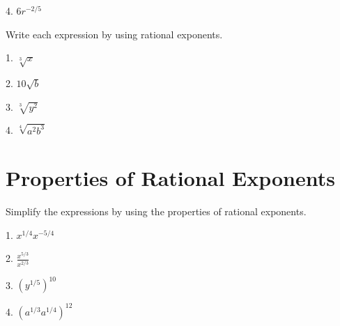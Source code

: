 \documentclass[12pt]{article}
\begin{document}
\vspace{4.5em} 

4. $6r^{-2/5}$ 

\vspace{4.5em} 

Write each expression by using rational exponents. 

1. $\sqrt[3]{x}$ 

\vspace{4.5em} 

2. $10\sqrt{b}$ 

\vspace{4.5em} 

3. $\sqrt[3]{y^{2}}$ 

\vspace{4.5em} 

4. $\sqrt[4]{a^{2}b^{3}}$ 

\vspace{4.5em} 

\section{Properties of Rational Exponents} 

Simplify the expressions by using the properties of rational exponents. 

\vspace{1.5em} 

1. $x^{1/4}x^{-5/4}$ 

\vspace{4.5em} 

2. $\frac{x^{5/3}}{x^{2/3}} $ 

\vspace{4.5em} 

3. $(y^{1/5})^{10}$ 

\vspace{4.5em} 

4. $(a^{1/3}a^{1/4})^{12}$
\end{document}
